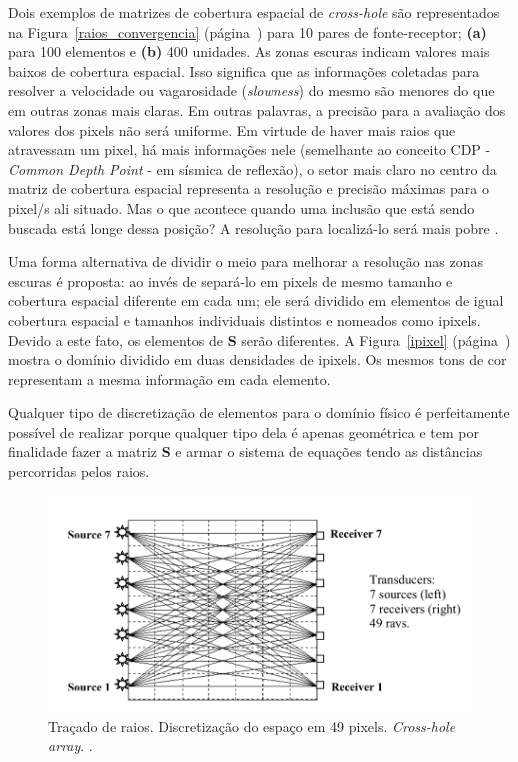 \documentclass[a4paper, 12 pt]{article} %
\begin{document}
Dois exemplos de matrizes de cobertura espacial de \textit{cross-hole} são representados na Figura~\ref{raios_convergencia} (página~\pageref{raios_convergencia}) para 10 pares de fonte-receptor; \textbf{(a)} para 100 elementos e \textbf{(b)} 400 unidades. As zonas escuras indicam valores mais baixos de cobertura espacial. Isso significa que as informações coletadas para resolver a velocidade ou vagarosidade (\textit{slowness}) do mesmo são menores do que em outras zonas mais claras. Em outras palavras, a precisão para a avaliação dos valores dos pixels não será uniforme. Em virtude de haver mais raios que atravessam um pixel, há mais informações nele (semelhante ao conceito CDP - \textit{Common Depth Point} - em sísmica de reflexão), o setor mais claro no centro da matriz de cobertura espacial representa a resolução e precisão máximas para o pixel/s ali situado. Mas o que acontece quando uma inclusão que está sendo buscada está longe dessa posição? A resolução para localizá-lo será mais pobre \citep{santamarina1998introduction}.

Uma forma alternativa de dividir o meio para melhorar a resolução nas zonas escuras é proposta: ao invés de separá-lo em pixels de mesmo tamanho e cobertura espacial diferente em cada um; ele será dividido em elementos de igual cobertura espacial e tamanhos individuais distintos e nomeados como ipixels. Devido a este fato, os elementos de $\textbf{S}$ serão diferentes. A Figura~\ref{ipixel} (página~\pageref{ipixel}) mostra o domínio dividido em duas densidades de ipixels. Os mesmos tons de cor representam a mesma informação em cada elemento.

Qualquer tipo de discretização de elementos para o domínio físico é perfeitamente possível de realizar porque qualquer tipo dela é apenas geométrica e tem por finalidade fazer a matriz $\textbf{S}$ e armar o sistema de equações tendo as distâncias percorridas pelos raios.

\begin{figure}[!hbtp]
	\begin{center}
		\includegraphics[scale=0.50]{Figuras/raios.png}
	\end{center}
	\caption{Traçado de raios. Discretização do espaço em 49 pixels. \textit{Cross-hole array}. \cite{RBGf1495}.}
	\label{raios}
\end{figure}
\end{document}
